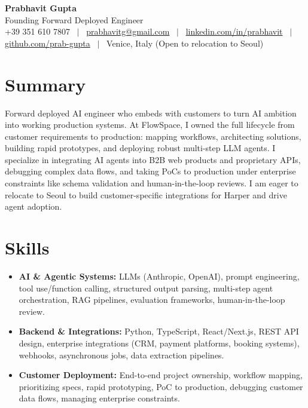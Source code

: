 \documentclass[a4paper,10pt]{article}
\begin{document}
\begin{center}
 {\Huge\bfseries Prabhavit Gupta}\\[4pt]
 {\color{accent}\large Founding Forward Deployed Engineer}\\[4pt]
 {\footnotesize +39 351 610 7807 ~$\vert$~
 \href{mailto:prabhavitg@gmail.com}{prabhavitg@gmail.com} ~$\vert$~
 \href{https://www.linkedin.com/in/prabhavit/}{linkedin.com/in/prabhavit} ~$\vert$~
 \href{https://github.com/prab-gupta}{github.com/prab-gupta} ~$\vert$~
 Venice, Italy (Open to relocation to Seoul)}
\end{center}
\vspace{-8pt}

\section{Summary}
Forward deployed AI engineer who embeds with customers to turn AI ambition into working production systems. At FlowSpace, I owned the full lifecycle from customer requirements to production: mapping workflows, architecting solutions, building rapid prototypes, and deploying robust multi-step LLM agents. I specialize in integrating AI agents into B2B web products and proprietary APIs, debugging complex data flows, and taking PoCs to production under enterprise constraints like schema validation and human-in-the-loop reviews. I am eager to relocate to Seoul to build customer-specific integrations for Harper and drive agent adoption.

\section{Skills}
\begin{itemize}
 \item \textbf{AI \& Agentic Systems:} LLMs (Anthropic, OpenAI), prompt engineering, tool use/function calling, structured output parsing, multi-step agent orchestration, RAG pipelines, evaluation frameworks, human-in-the-loop review.
 \item \textbf{Backend \& Integrations:} Python, TypeScript, React/Next.js, REST API design, enterprise integrations (CRM, payment platforms, booking systems), webhooks, asynchronous jobs, data extraction pipelines.
 \item \textbf{Customer Deployment:} End-to-end project ownership, workflow mapping, prioritizing specs, rapid prototyping, PoC to production, debugging customer data flows, managing enterprise constraints.
\end{itemize}
\end{document}
